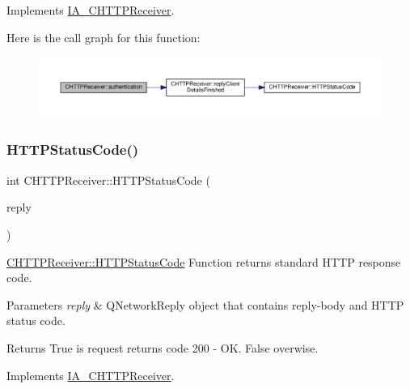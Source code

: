 Implements \hyperlink{classIA__CHTTPReceiver}{I\+A\+\_\+\+C\+H\+T\+T\+P\+Receiver}.

Here is the call graph for this function\+:
\nopagebreak
\begin{figure}[H]
\begin{center}
\leavevmode
\includegraphics[width=350pt]{classCHTTPReceiver_af4be4d5ce59a99993417786637f7cc64_cgraph}
\end{center}
\end{figure}
\mbox{\label{classCHTTPReceiver_a0e79cd1e6bf464be0420de66685a3398}} 
\subsubsection{\texorpdfstring{H\+T\+T\+P\+Status\+Code()}{HTTPStatusCode()}}
{\footnotesize\ttfamily int C\+H\+T\+T\+P\+Receiver\+::\+H\+T\+T\+P\+Status\+Code (\begin{DoxyParamCaption}\item[{Q\+Network\+Reply $\ast$}]{reply }\end{DoxyParamCaption})\hspace{0.3cm}{\ttfamily [virtual]}}



\hyperlink{classCHTTPReceiver_a0e79cd1e6bf464be0420de66685a3398}{C\+H\+T\+T\+P\+Receiver\+::\+H\+T\+T\+P\+Status\+Code} Function returns standard H\+T\+TP response code. 


\begin{DoxyParams}{Parameters}
{\em reply} & Q\+Network\+Reply object that contains reply-\/body and H\+T\+TP status code. \\
\hline
\end{DoxyParams}
\begin{DoxyReturn}{Returns}
True is request returns code 200 -\/ OK. False overwise. 
\end{DoxyReturn}


Implements \hyperlink{classIA__CHTTPReceiver}{I\+A\+\_\+\+C\+H\+T\+T\+P\+Receiver}.

